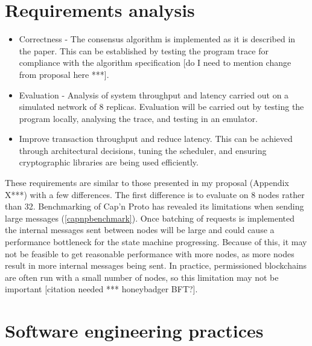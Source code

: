 \section{Requirements analysis}
\begin{itemize}
	\item Correctness - The consensus algorithm is implemented as it is described in the paper. This can be established by testing the program trace for compliance with the algorithm specification [do I need to mention change from proposal here ***].
	\item Evaluation - Analysis of system throughput and latency carried out on a simulated network of 8 replicas. Evaluation will be carried out by testing the program locally, analysing the trace, and testing in an emulator.
	\item Improve transaction throughput and reduce latency. This can be achieved through architectural decisions, tuning the scheduler, and ensuring cryptographic libraries are being used efficiently.
\end{itemize}

These requirements are similar to those presented in my proposal (Appendix X***) with a few differences. The first difference is to evaluate on 8 nodes rather than 32. Benchmarking of Cap'n Proto has revealed its limitations when sending large messages (\ref{capnpbenchmark}). Once batching of requests is implemented the internal messages sent between nodes will be large and could cause a performance bottleneck for the state machine progressing. Because of this, it may not be feasible to get reasonable performance with more nodes, as more nodes result in more internal messages being sent. In practice, permissioned blockchains are often run with a small number of nodes, so this limitation may not be important [citation needed *** honeybadger BFT?].


\section{Software engineering practices}
